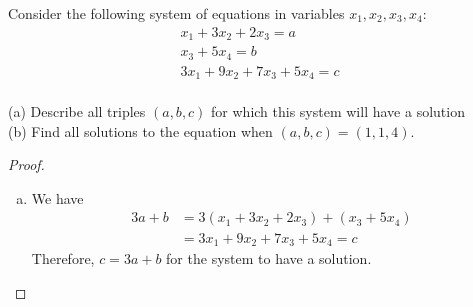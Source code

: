\begin{question}
	\normalfont
	
	Consider the following system of equations in variables $x_1,x_2,x_3,x_4$:
	\[
	\begin{array}{r}
	x_1 + 3x_2 + 2x_3 = a \\
	x_3 + 5 x_4 = b \\
	3x_1 + 9x_2 + 7x_3 + 5x_4 = c \\
	\end{array}
	\]
	
\noindent (a) Describe all triples $(a,b,c)$ for which this system will have a solution \\


\noindent (b) Find all solutions to the equation when  $(a,b,c)=(1,1,4)$. 
	
	
\end{question}

\begin{proof}
    \begin{enumerate}[(a)]
        \item We have 
        \[
            \begin{aligned}
                3a+b&=3(x_1+3x_2+2x_3)+(x_3+5x_4)\\
                &=3x_1+9x_2+7x_3+5x_4=c
            \end{aligned}
        \]
        Therefore, $c=3a+b$ for the system to have a solution.
    \end{enumerate}
\end{proof}